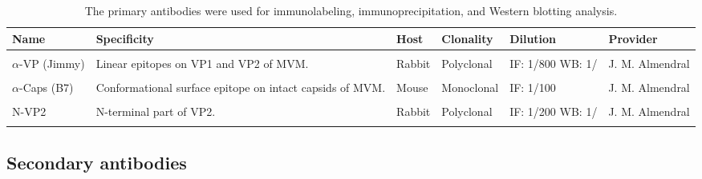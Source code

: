 \begin{small}
\begin{center}
\begin{table}[H]
\begin{tabular}{ P{2 cm} p{4.5cm} l l P{2.3 cm} p{3 cm}}
\textbf{Name} & \textbf{Specificity} & \textbf{Host} & \textbf{Clonality} & \textbf{Dilution} & \textbf{Provider}\\
\hline
\\
$\alpha$-VP (Jimmy) & Linear epitopes on VP1 and VP2 of MVM. & Rabbit & Polyclonal & IF: 1/800 WB: 1/  & J. M. Almendral \cite{pmid15367635}\\ 
\\
$\alpha$-Caps \newline(B7) & Conformational surface epitope on intact capsids of MVM. & Mouse & Monoclonal & IF: 1/100 & J. M. Almendral \cite{pmid12552010} \\ 
\\
N-VP2 & N-terminal part of VP2. & Rabbit & Polyclonal & IF: 1/200 WB: 1/ & J. M. Almendral \cite{pmid15367635}\\
\\
\end{tabular}

\caption[Primary antibodies]{\normalsize The primary antibodies were used for immunolabeling, immunoprecipitation, and Western blotting analysis.}
\label{Primary antibodies}
\end{table}
\end{center}
\end{small}


\subsection{Secondary antibodies}


